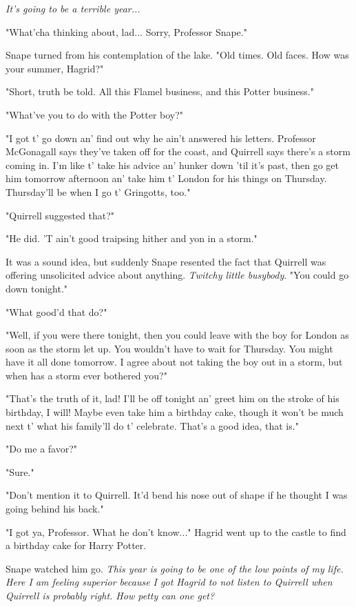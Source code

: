 \documentclass[a4paper,11pt]{article}
\begin{document}
\emph{It's going to be a terrible year...}

"What'cha thinking about, lad... Sorry, Professor Snape."

Snape turned from his contemplation of the lake. "Old times. Old faces. How was your summer, Hagrid?"

"Short, truth be told. All this Flamel business, and this Potter business."

"What've you to do with the Potter boy?"

"I got t' go down an' find out why he ain't answered his letters. Professor McGonagall says they've taken off for the coast, and Quirrell says there's a storm coming in. I'm like t' take his advice an' hunker down 'til it's past, then go get him tomorrow afternoon an' take him t' London for his things on Thursday. Thursday'll be when I go t' Gringotts, too."

"Quirrell suggested that?"

"He did. 'T ain't good traipsing hither and yon in a storm."

It was a sound idea, but suddenly Snape resented the fact that Quirrell was offering unsolicited advice about anything. \emph{Twitchy little busybody}. "You could go down tonight."

"What good'd that do?"

"Well, if you were there tonight, then you could leave with the boy for London as soon as the storm let up. You wouldn't have to wait for Thursday. You might have it all done tomorrow. I agree about not taking the boy out in a storm, but when has a storm ever bothered you?"

"That's the truth of it, lad! I'll be off tonight an' greet him on the stroke of his birthday, I will! Maybe even take him a birthday cake, though it won't be much next t' what his family'll do t' celebrate. That's a good idea, that is."

"Do me a favor?"

"Sure."

"Don't mention it to Quirrell. It'd bend his nose out of shape if he thought I was going behind his back."

"I got ya, Professor. What he don't know..." Hagrid went up to the castle to find a birthday cake for Harry Potter.

Snape watched him go. \emph{This year is going to be one of the low points of my life. Here I am feeling superior because I got Hagrid to not listen to Quirrell when Quirrell is probably right. How petty can one get?}
\end{document}

